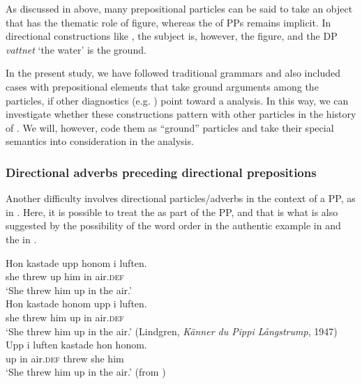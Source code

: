 \documentclass[output=paper]{langscibook}
\begin{document}
As discussed in  above, many prepositional particles can be said to take an object that has the thematic role of figure, whereas the  of PPs remains implicit. In directional constructions like , the subject is, however, the figure, and the DP \textit{vattnet} ‘the water’ is the ground.



In the present study, we have followed traditional grammars and also included cases with prepositional elements that take ground arguments among the particles, if other diagnostics (e.g. ) point toward a  analysis. In this way, we can investigate whether these constructions pattern with other particles in the history of . We will, however, code them as “ground” particles and take their special semantics into consideration in the analysis.



\subsubsection{Directional adverbs preceding directional prepositions} 
Another difficulty involves directional particles/adverbs in the context of a PP, as in . Here, it is possible to treat the  as part of the PP, and that is what is also suggested by the possibility of the word order in the authentic example in  and the  in .


\ea\label{ex:lalu:17}
\ea\label{ex:lalu:17a}
\gll  Hon   kastade   upp    honom   i   luften.\\
    she     threw   up   him     in     air\textsc{.def}\\
\glt `She threw him up in the air.’\\

\ex\label{ex:lalu:17b}
\gll  Hon   kastade   honom   upp   i   luften.\\
    she     threw   him     up   in   air\textsc{.def}\\
\glt `She threw him up in the air.’ (Lindgren, \textit{Känner du Pippi Långstrump}, 1947)\\
\ex\label{ex:lalu:17c}
\gll Upp   i   luften   kastade   hon   honom. \\
    up     in   air.\textsc{def}   threw   she   him\\
\glt `She threw him up in the air.’     (from \citealt{LarssonLundquist2014})\\
\z
\z
\end{document}
